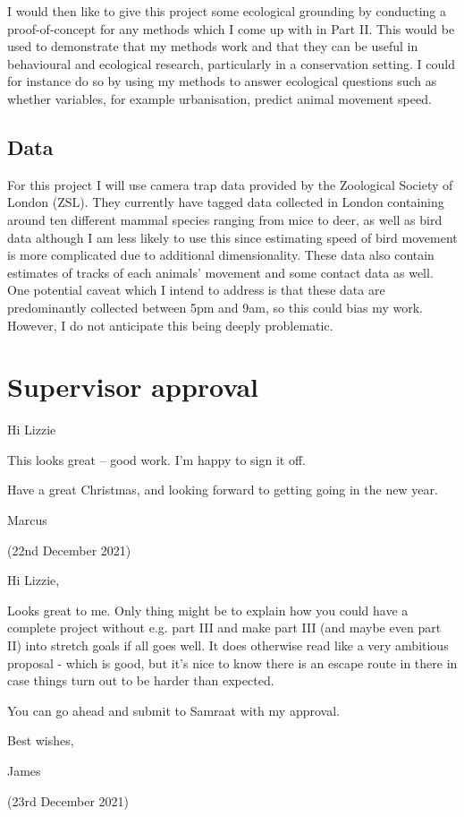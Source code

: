 \documentclass[11pt]{article}
\begin{document}
	I would then like to give this project some ecological grounding by conducting a proof-of-concept for any methods which I come up with in Part II. This would be used to demonstrate that my methods work and that they can be useful in behavioural and ecological research, particularly in a conservation setting. I could for instance do so by using my methods to answer ecological questions such as whether variables, for example urbanisation, predict animal movement speed.
	
	
	\subsection{Data}
	
	For this project I will use camera trap data provided by the Zoological Society of London (ZSL). They currently have tagged data collected in London containing around ten different mammal species ranging from mice to deer, as well as bird data although I am less likely to use this since estimating speed of bird movement is more complicated due to additional dimensionality. These data also contain estimates of tracks of each animals' movement and some contact data as well. One potential caveat which I intend to address is that these data are predominantly collected between 5pm and 9am, so this could bias my work. However, I do not anticipate this being deeply problematic.
	
		
	

	
	
	\section{Supervisor approval}
	
	
	Hi Lizzie
	
	This looks great – good work. I’m happy to sign it off.
	
	Have a great Christmas, and looking forward to getting going in the new year.
	
	Marcus
	
	(22nd December 2021)
	\newline
	
	Hi Lizzie,
	
	Looks great to me.  Only thing might be to explain how you could have a complete project without e.g. part III and make part III (and maybe even part II) into stretch goals if all goes well.  It does otherwise read like a very ambitious proposal - which is good, but it’s nice to know there is an escape route in there in case things turn out to be harder than expected.
	
	You can go ahead and submit to Samraat with my approval.
	
	Best wishes,
	
	James
	
	(23rd December 2021)
	
	
	
	
	
	
\end{document}
